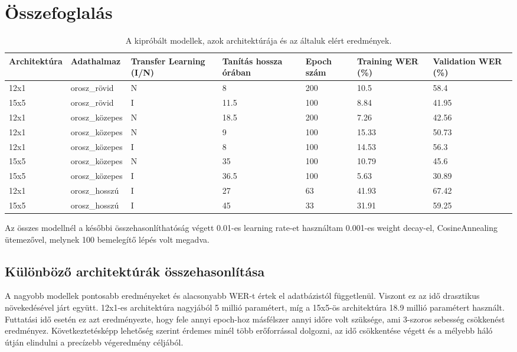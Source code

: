 \chapter{Összefoglalás}

\begin{table}[ht]
	\footnotesize
	\centering
	\begin{tabular}{ p{2cm} p{2cm} p{1.5cm} p{2cm} p{1.5cm} p{1.5cm} p{1.5cm} }
		\toprule
		\textbf{Architektúra} & \textbf{Adathalmaz} & \textbf {Transfer Learning (I/N)} & \textbf{Tanítás hossza órában} & \textbf{Epoch szám} & \textbf{Training WER (\%)} & \textbf{Validation WER (\%)} \\
		\midrule
		12x1 & orosz\_rövid & N & 8 & 200 & 10.5 & 58.4 \\
		\hline
		15x5 & orosz\_rövid & I & 11.5 & 100 & 8.84 & 41.95 \\
		\hline
		12x1 & orosz\_közepes & N & 18.5 & 200 & 7.26 & 42.56 \\
		\hline
		12x1 & orosz\_közepes & N & 9 & 100 & 15.33 & 50.73 \\
		\hline
		12x1 & orosz\_közepes & I & 8 & 100 & 14.53 & 56.3 \\
		\hline
		15x5 & orosz\_közepes & N & 35 & 100 & 10.79 & 45.6 \\
		\hline
		15x5 & orosz\_közepes & I & 36.5 & 100 & 5.63 & 30.89 \\
		\hline
		12x1 & orosz\_hosszú & I & 27 & 63 & 41.93 & 67.42 \\
		\hline
		15x5 & orosz\_hosszú & I & 45 & 33 & 31.91 & 59.25 \\
		\bottomrule
	\end{tabular}
	\caption{A kipróbált modellek, azok architektúrája és az általuk elért eredmények.}
\end{table}

Az összes modellnél a későbbi összehasonlíthatóság végett 0.01-es learning rate-et használtam 0.001-es weight decay-el, CosineAnnealing ütemezővel, melynek 100 bemelegítő lépés volt megadva.

\section{Különböző architektúrák összehasonlítása}

A nagyobb modellek pontosabb eredményeket és alacsonyabb WER-t értek el adatbázistól függetlenül. Viszont ez az idő drasztikus növekedésével járt együtt. 12x1-es architektúra nagyjából 5 millió paramétert, míg a 15x5-ös architektúra 18.9 millió paramétert használt. Futtatási idő esetén ez azt eredményezte, hogy fele annyi epoch-hoz másfélszer annyi időre volt szüksége, ami 3-szoros sebesség csökkenést eredményez. Következtetésképp lehetőség szerint érdemes minél több erőforrással dolgozni, az idő csökkentése végett és a mélyebb háló útján elindulni a precízebb végeredmény céljából.

